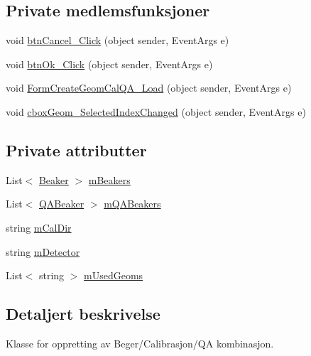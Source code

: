 \subsection*{Private medlemsfunksjoner}
\begin{DoxyCompactItemize}
\item 
void \hyperlink{class_scintilab_1_1_form_create_geom_cal_q_a_ad439621a2c9c2d52eec1678d5da06247}{btn\+Cancel\+\_\+\+Click} (object sender, Event\+Args e)
\item 
void \hyperlink{class_scintilab_1_1_form_create_geom_cal_q_a_a0afdd66090808e5bd2df328e20d81123}{btn\+Ok\+\_\+\+Click} (object sender, Event\+Args e)
\item 
void \hyperlink{class_scintilab_1_1_form_create_geom_cal_q_a_a4b1e8284cd6ca9b42d1fff7559f721ea}{Form\+Create\+Geom\+Cal\+Q\+A\+\_\+\+Load} (object sender, Event\+Args e)
\item 
void \hyperlink{class_scintilab_1_1_form_create_geom_cal_q_a_ac7a9f83e05398d7c2ba7ffd7791a31c0}{cbox\+Geom\+\_\+\+Selected\+Index\+Changed} (object sender, Event\+Args e)
\end{DoxyCompactItemize}
\subsection*{Private attributter}
\begin{DoxyCompactItemize}
\item 
List$<$ \hyperlink{class_scintilab_1_1_beaker}{Beaker} $>$ \hyperlink{class_scintilab_1_1_form_create_geom_cal_q_a_a5ef5f866428bd7129184e31b6a38ce41}{m\+Beakers}
\item 
List$<$ \hyperlink{class_scintilab_1_1_q_a_beaker}{Q\+A\+Beaker} $>$ \hyperlink{class_scintilab_1_1_form_create_geom_cal_q_a_af6d0e7f88cf2381eee36d1c4c13106d5}{m\+Q\+A\+Beakers}
\item 
string \hyperlink{class_scintilab_1_1_form_create_geom_cal_q_a_a6364a9962eee023eba3af60d2b3f3a91}{m\+Cal\+Dir}
\item 
string \hyperlink{class_scintilab_1_1_form_create_geom_cal_q_a_a2990b98661b1e6bec61d6da32629944c}{m\+Detector}
\item 
List$<$ string $>$ \hyperlink{class_scintilab_1_1_form_create_geom_cal_q_a_a090638f16b85aa89acccb3418e478297}{m\+Used\+Geoms}
\end{DoxyCompactItemize}


\subsection{Detaljert beskrivelse}
Klasse for oppretting av Beger/\+Calibrasjon/\+Q\+A kombinasjon. 


